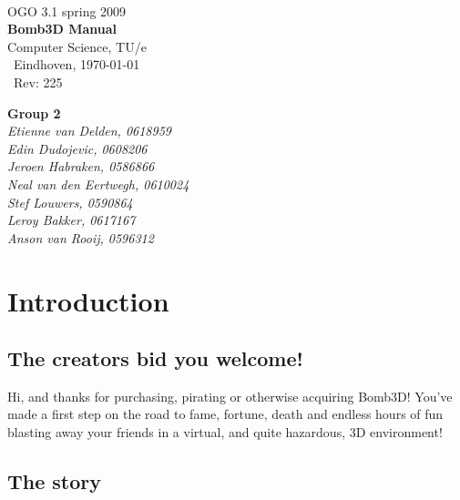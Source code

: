 \documentclass[a4paper,twoside,11pt]{book}
\theoremstyle{plain} \newtheorem{powerup}{Power-Up}
\begin{document}
   \begin{titlepage}
        {\ }\\[5.0cm]
        { {\Large OGO 3.1 spring 2009}}\\[0.2cm]
        {\bf \Huge Bomb3D Manual}\\[0.1cm]
        { {\Large {Computer Science, TU/e} }}\\[1.0cm]
        {\ Eindhoven, \today }\\[0.2cm]
		  {\ $ $Rev: 225 $ $ }\\[0.2cm]
        \begin{flushright}
            {\bf {\small Group 2 }}\\[0.0cm]
            {\em {\small Etienne van Delden, 0618959}}\\
            {\em {\small Edin Dudojevic, 0608206}}\\
            {\em {\small Jeroen Habraken, 0586866}}\\
            {\em {\small Neal van den Eertwegh, 0610024 }}\\
            {\em {\small Stef Louwers, 0590864}}\\
            {\em {\small Leroy Bakker, 0617167}}\\
            {\em {\small Anson van Rooij, 0596312}}\\[0.5cm]
        \end{flushright}
    \end{titlepage}
    \tableofcontents



\chapter{Introduction} %
\label{cha:introduction}

\section{The creators bid you welcome!} %
\label{sec:the_creators_bid_you_welcome_}

Hi, and thanks for purchasing, pirating or otherwise acquiring Bomb3D! You've made a first step on the road to fame, fortune, death and endless hours of fun blasting away your friends in a virtual, and quite hazardous, 3D environment!


\section{The story} %
  \label{sub:the_story}
\end{document}
